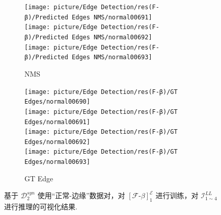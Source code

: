 \documentclass[a4paper]{ctexart}
\begin{document}
\begin{figure}[htbp]
\begin{subfigure}{0.16\textwidth}
			\texttt{[image: picture/Edge Detection/res(F-β)/Predicted Edges NMS/normal00691]} \\
			\texttt{[image: picture/Edge Detection/res(F-β)/Predicted Edges NMS/normal00692]} \\
			\texttt{[image: picture/Edge Detection/res(F-β)/Predicted Edges NMS/normal00693]}
			\caption{NMS}
		\end{subfigure}
		\begin{subfigure}{0.16\textwidth}
			\texttt{[image: picture/Edge Detection/res(F-β)/GT Edges/normal00690]} \\
			\texttt{[image: picture/Edge Detection/res(F-β)/GT Edges/normal00691]} \\
			\texttt{[image: picture/Edge Detection/res(F-β)/GT Edges/normal00692]} \\
			\texttt{[image: picture/Edge Detection/res(F-β)/GT Edges/normal00693]}
			\caption{GT Edge}
		\end{subfigure}
		\caption{基于 $\mathcal{D}^{syn}_{2}$ 使用“正常-边缘”数据对，对 ${\left[\mathcal{F}\text{-}\beta\right]}^{\mathcal{E}}_1$ 进行训练，对 $\mathcal{I}_{1 \sim 4}^{LL}$ 进行推理的可视化结果.}
	\end{figure}
	
\end{document}
